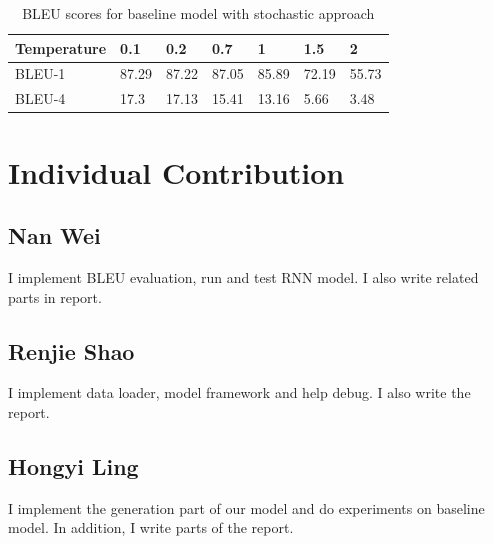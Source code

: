 \documentclass{article} %
\begin{document}
\begin{table}[htb!]
    \centering
    \begin{tabular}{l|l|l|l|l|l|l}
    \hline
    Temperature & 0.1   & 0.2   & 0.7   & 1     & 1.5   & 2     \\\hline
    BLEU-1      & 87.29 & 87.22 & 87.05 & 85.89 & 72.19 & 55.73 \\\hline
    BLEU-4      & 17.3  & 17.13 & 15.41 & 13.16 & 5.66  & 3.48 \\\hline
    \end{tabular}
    \caption{BLEU scores for baseline model with stochastic approach}
    \label{baseline_table}  
\end{table}

\section{Individual Contribution}

\subsection*{Nan Wei}
I implement BLEU evaluation, run and test RNN model. I also write related parts in report.

\subsection*{Renjie Shao}
I implement data loader, model framework and help debug. I also write the report.
\subsection*{Hongyi Ling}
I implement the generation part of our model and do experiments on baseline model.  In addition, I write parts of the report.



\end{document}
